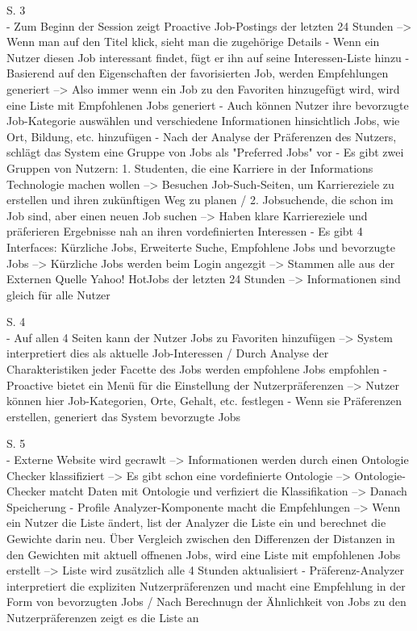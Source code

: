 S. 3\\
- Zum Beginn der Session zeigt Proactive Job-Postings der letzten 24 Stunden --> Wenn man auf den Titel klick, sieht man die zugehörige Details
- Wenn ein Nutzer diesen Job interessant findet, fügt er ihn auf seine Interessen-Liste hinzu
- Basierend auf den Eigenschaften der favorisierten Job, werden Empfehlungen generiert --> Also immer wenn ein Job zu den Favoriten hinzugefügt wird, wird eine Liste mit Empfohlenen Jobs generiert
- Auch können Nutzer ihre bevorzugte Job-Kategorie auswählen und verschiedene Informationen hinsichtlich Jobs, wie Ort, Bildung, etc. hinzufügen
- Nach der Analyse der Präferenzen des Nutzers, schlägt das System eine Gruppe von Jobs als "Preferred Jobs" vor
- Es gibt zwei Gruppen von Nutzern: 1. Studenten, die eine Karriere in der Informations Technologie machen wollen --> Besuchen Job-Such-Seiten, um Karriereziele zu erstellen und ihren zukünftigen Weg zu planen / 2. Jobsuchende, die schon im Job sind, aber einen neuen Job suchen --> Haben klare Karriereziele und präferieren Ergebnisse nah an ihren vordefinierten Interessen
- Es gibt 4 Interfaces: Kürzliche Jobs, Erweiterte Suche, Empfohlene Jobs und bevorzugte Jobs --> Kürzliche Jobs werden beim Login angezgit --> Stammen alle aus der Externen Quelle Yahoo! HotJobs der letzten 24 Stunden --> Informationen sind gleich für alle Nutzer

S. 4\\
- Auf allen 4 Seiten kann der Nutzer Jobs zu Favoriten hinzufügen --> System interpretiert dies als aktuelle Job-Interessen / Durch Analyse der Charakteristiken jeder Facette des Jobs werden empfohlene Jobs empfohlen
- Proactive bietet ein Menü für die Einstellung der Nutzerpräferenzen --> Nutzer können hier Job-Kategorien, Orte, Gehalt, etc. festlegen
- Wenn sie Präferenzen erstellen, generiert das System bevorzugte Jobs

S. 5\\
- Externe Website wird gecrawlt --> Informationen werden durch einen Ontologie Checker klassifiziert --> Es gibt schon eine vordefinierte Ontologie --> Ontologie-Checker matcht Daten mit Ontologie und verfiziert die Klassifikation --> Danach Speicherung
- Profile Analyzer-Komponente macht die Empfehlungen --> Wenn ein Nutzer die Liste ändert, list der Analyzer die Liste ein und berechnet die Gewichte darin neu. Über Vergleich zwischen den Differenzen der Distanzen in den Gewichten mit aktuell offnenen Jobs, wird eine Liste mit empfohlenen Jobs erstellt --> Liste wird zusätzlich alle 4 Stunden aktualisiert
- Präferenz-Analyzer interpretiert die expliziten Nutzerpräferenzen und macht eine Empfehlung in der Form von bevorzugten Jobs / Nach Berechnugn der Ähnlichkeit von Jobs zu den Nutzerpräferenzen zeigt es die Liste an

